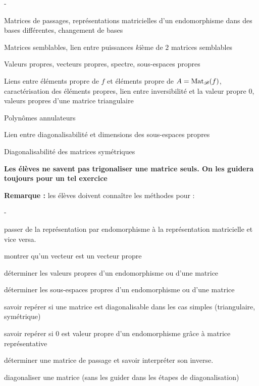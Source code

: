 \documentclass[11pt]{article}%
\begin{document}
\begin{noliste}{-}
 \item Matrices de passages, représentations matricielles d'un 
  endomorphisme dans des bases différentes, changement de bases
  \item Matrices semblables, lien entre puissances $k$ième de $2$ 
  matrices semblables
  \item Valeurs propres, vecteurs propres, spectre, sous-espaces propres
  \item Liens entre éléments propre de $f$ et éléments propre de 
  $A={\rm{Mat}}_{\mathscr{B}}(f)$, caractérisation des éléments propres, lien entre 
  inversibilité et la valeur propre $0$, valeurs propres d'une matrice 
  triangulaire
  \item Polynômes annulateurs
  \item Lien entre diagonalisabilité et dimensions des sous-espaces 
  propres
  \item Diagonalisabilité des matrices symétriques
  \item {\bf Les élèves ne savent pas trigonaliser une matrice seuls.
  On les guidera toujours pour un tel exercice}
\end{noliste}

\vspace*{1cm}

\noindent
{\bf Remarque :} les élèves doivent connaître les méthodes pour :
\begin{noliste}{-}
\item passer de la représentation par endomorphisme à la 
représentation matricielle et vice versa.
\item montrer qu'un vecteur est un vecteur propre
\item déterminer les valeurs propres d'un endomorphisme ou 
d'une matrice
\item déterminer les sous-espaces propres d'un endomorphisme 
ou d'une matrice
\item savoir repérer si une matrice est diagonalisable dans les cas 
simples (triangulaire, symétrique)
\item savoir repérer si $0$ est valeur propre d'un endomorphisme grâce 
à matrice représentative
\item déterminer une matrice de passage et savoir interpréter 
son inverse.
\item diagonaliser une matrice (sans les guider dans les étapes de 
diagonalisation)
\end{noliste}
\end{document}
